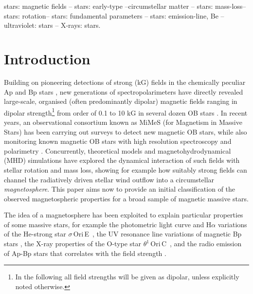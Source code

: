 \documentclass[useAMS,usenatbib]{mn2e}
\newcommand{\oriunc}{$\theta^1$\,Ori\,C}
\newcommand{\sigorie}{$\sigma$\,Ori\,E}
\begin{document}
\begin{keywords}
stars: magnetic fields -- stars: early-type --circumstellar matter -- stars: mass-loss-- stars: rotation--  stars: fundamental parameters -- stars: emission-line, Be -- ultraviolet: stars -- X-rays: stars.
\end{keywords}

\section{Introduction}

Building on pioneering detections of strong (kG) fields in the chemically peculiar Ap and Bp stars \citep[e.g.][]{1947ApJ...105..105B,1980ApJS...42..421B}, new generations of spectropolarimeters have directly revealed large-scale, organised (often predominantly dipolar) magnetic fields ranging in dipolar strength\footnote{In the following all field strengths will be given as dipolar, unless explicitly noted otherwise.} from order of 0.1 to 10 kG in several dozen OB stars \citep[e.g.][]{2002MNRAS.333...55D,2006MNRAS.365L...6D,2006MNRAS.369L..61H,2008MNRAS.387L..23P,2009MNRAS.400L..94G,2010MNRAS.407.1423M}.
In recent years,  an observational consortium known as MiMeS (for Magnetism in Massive Stars) has been carrying out surveys to detect new magnetic OB stars, while also monitoring known magnetic OB stars with high resolution spectroscopy and polarimetry \citep{2010arXiv1009.3563W}.
Concurrently, theoretical models \citep{2005ApJ...630L..81T,2007MNRAS.382..139T} and magnetohydrodynamical (MHD) simulations 
\citep{2002ApJ...576..413U,2008MNRAS.385...97U,2009MNRAS.392.1022U} have explored the dynamical interaction of such fields with stellar rotation and mass loss, showing for example how suitably strong fields can channel the radiatively driven stellar wind outflow into a circumstellar \textit{magnetosphere}.
This paper aims now to provide an initial classification of the observed magnetospheric properties for a broad sample of magnetic massive stars.

The idea of a magnetosphere has been exploited to explain particular properties of some massive stars, for example the photometric light curve and H$\alpha$ variations of the He-strong star \sigorie\ \citep{1978ApJ...224L...5L}, the UV resonance line variations of magnetic Bp stars \citep{1990ApJ...365..665S}, the X-ray properties of the O-type star \oriunc\ \citep{2005ApJ...628..986G}, and the radio emission of Ap-Bp stars that correlates with the field strength \citep{1992ApJ...393..341L}.
\end{document}
